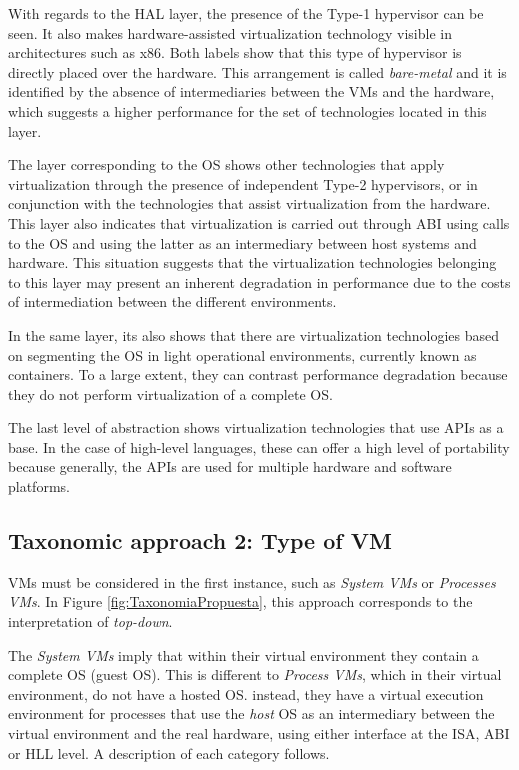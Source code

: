 	With regards to the HAL layer, the presence of the Type-1 hypervisor can be seen. It also makes hardware-assisted virtualization technology visible in architectures such as x86. Both labels show that this type of hypervisor is directly placed over the hardware.  This arrangement is called \textit{bare-metal} and it is identified by the absence of intermediaries between the VMs and the hardware, which suggests a higher performance for the set of technologies located in this layer.
	
	The layer corresponding to the OS shows other technologies that apply virtualization through the presence of independent Type-2 hypervisors, or in conjunction with the technologies that assist virtualization from the hardware. This layer also indicates that virtualization is carried out through ABI using calls to the OS and using the latter as an intermediary between host systems and hardware. This situation suggests that the virtualization technologies belonging to this layer may present an inherent degradation in performance due to the costs of intermediation between the different environments.
	
	In the same layer, its also shows that there are virtualization technologies based on segmenting the OS in light operational environments, currently known as containers. To a large extent, they can contrast performance degradation because they do not perform virtualization of a complete OS.
	
	The last level of abstraction shows virtualization technologies that use APIs as a base. In the case of high-level languages, these can offer a high level of portability because generally, the APIs are used for multiple hardware and software platforms.
	
	\subsection{Taxonomic approach 2: Type of VM}
	
	VMs must be considered in the first instance, such as \textit{System VMs} or \textit{ Processes VMs}. In Figure \ref{fig:TaxonomiaPropuesta}, this approach corresponds to the interpretation of \textit{top-down}.
	
	The \textit{System VMs} imply that within their virtual environment they contain a complete OS (guest OS). This is different to \textit{Process VMs}, which in their virtual environment, do not have a hosted OS. instead, they have a virtual execution environment for processes that use the \textit{host} OS as an intermediary between the virtual environment and the real hardware, using either interface at the ISA, ABI or HLL level. A description of each category follows.
	
